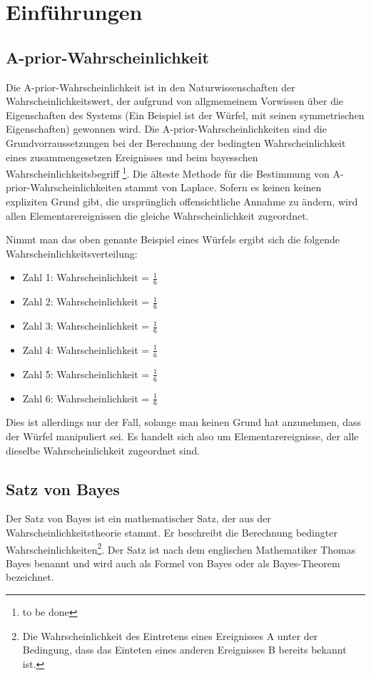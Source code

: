 \chapter{Einführungen}

\section{A-prior-Wahrscheinlichkeit}

Die A-prior-Wahrscheinlichkeit ist in den Naturwissenschaften der Wahrscheinlichkeitswert, der aufgrund von allgmemeinem Vorwissen über die Eigenschaften des Systems
(Ein Beispiel ist der Würfel, mit seinen symmetrischen Eigenschaften) gewonnen wird. Die A-prior-Wahrscheinlichkeiten sind die Grundvorraussetzungen
bei der Berechnung der bedingten Wahrscheinlichkeit eines zusammengesetzen Ereignisses und beim bayesschen Wahrscheinlichkeitsbegriff \footnote{to be done}.
Die älteste Methode für die Bestimmung von A-prior-Wahrscheinlichkeiten stammt von Laplace. Sofern es keinen keinen expliziten Grund gibt, die ursprünglich
offensichtliche Annahme zu ändern, wird allen Elementarereignissen die gleiche Wahrscheinlichkeit zugeordnet. \cite[S. 80f]{Pap:1995}

Nimmt man das oben genante Beispiel eines Würfels ergibt sich die folgende Wahrscheinlichkeitsverteilung:

\begin{itemize}
    \item Zahl 1: Wahrscheinlichkeit = $\frac{1}{6}$
    \item Zahl 2: Wahrscheinlichkeit = $\frac{1}{6}$
    \item Zahl 3: Wahrscheinlichkeit = $\frac{1}{6}$
    \item Zahl 4: Wahrscheinlichkeit = $\frac{1}{6}$
    \item Zahl 5: Wahrscheinlichkeit = $\frac{1}{6}$
    \item Zahl 6: Wahrscheinlichkeit = $\frac{1}{6}$
\end{itemize}

Dies ist allerdings nur der Fall, solange man keinen Grund hat anzunehmen, dass der Würfel manipuliert sei. Es handelt sich also um Elementarereignisse, der
alle dieselbe Wahrscheinlichkeit zugeordnet sind.

\section{Satz von Bayes}

Der Satz von Bayes ist ein mathematischer Satz, der aus der Wahrscheinlichkeitstheorie stammt. Er beschreibt die Berechnung bedingter
Wahrscheinlichkeiten\footnote{Die Wahrscheinlichkeit des Eintretens eines Ereignisses A unter der Bedingung, dass das Einteten eines anderen Ereignisses B bereits bekannt ist.}.
Der Satz ist nach dem englischen Mathematiker Thomas Bayes benannt und wird auch als Formel von Bayes oder als Bayes-Theorem bezeichnet. \cite[S.411f]{Papula:2014}


